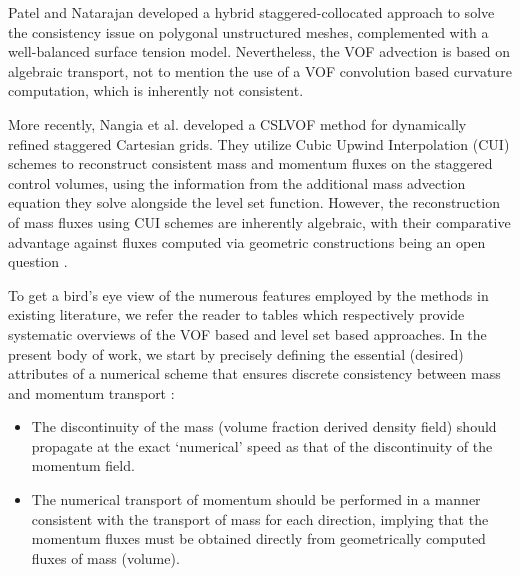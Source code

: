 Patel and Natarajan  developed a hybrid 
staggered-collocated approach to solve the consistency issue on 
polygonal unstructured meshes, complemented with a well-balanced surface tension model. 
Nevertheless, the VOF advection is based on algebraic transport, 
not to mention the use of a VOF convolution based 
curvature computation, which is inherently not consistent. 


More recently, Nangia et al.  developed a 
CSLVOF method for dynamically refined staggered Cartesian grids. 
They utilize Cubic Upwind Interpolation (CUI) schemes to 
reconstruct consistent mass and momentum fluxes on the staggered 
control volumes, using the information from the additional mass 
advection equation they solve alongside the level set function.   
However, the reconstruction of mass fluxes using CUI schemes are 
inherently algebraic, with their comparative advantage against fluxes 
computed via geometric constructions being an open question 
.

To get a bird's eye view of the numerous features employed by the methods 
in existing literature, we refer the reader to tables %
which respectively provide systematic overviews of the VOF based and level set based approaches.    
In the present body of work, we start by precisely defining the
essential (desired) attributes of a numerical scheme that 
ensures discrete consistency between mass and momentum transport : 

\begin{itemize}
	\item The discontinuity of the mass (volume fraction 
		derived density field) should propagate at the 
		exact `numerical' speed as that of 
		the discontinuity of the momentum field. 
	\item The numerical transport of momentum should be performed 
		in a manner consistent with the transport of mass for 
		each direction, implying that the momentum fluxes must 
		be obtained directly from geometrically 
		computed fluxes of mass (volume). 
\end{itemize}

